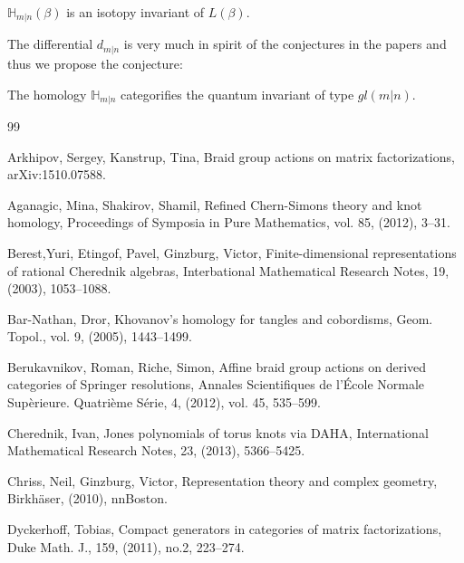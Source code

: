 \documentclass[10pt]{amsart}
\begin{document}
\begin{theorem}\cite{OR} $\mathbb{H}_{m|n}(\beta)$ is an isotopy invariant of $L(\beta)$.
\end{theorem}

The differential $d_{m|n}$ is very much in spirit of the conjectures in the papers \cite{ORS, GGS} and thus we propose the conjecture:

\begin{conjecture} The homology $\mathbb{H}_{m|n}$ categorifies the quantum invariant of type $gl(m|n)$.
\end{conjecture}




\printindex[notationlist]





\begin{thebibliography}{99}


 Arkhipov, Sergey,
Kanstrup, Tina,
Braid group actions on matrix factorizations, arXiv:1510.07588.




Aganagic, Mina,
Shakirov, Shamil,
Refined Chern-Simons theory and knot homology,
Proceedings of Symposia in Pure Mathematics,
vol. 85,
(2012),
3--31.



Berest,Yuri,
Etingof, Pavel,
Ginzburg, Victor,
Finite-dimensional representations of rational Cherednik algebras,
Interbational Mathematical Research Notes, 19,
(2003),
1053--1088.


Bar-Nathan, Dror,
Khovanov's homology for tangles and cobordisms,
Geom. Topol.,
vol. 9,
(2005),
1443--1499.


 Berukavnikov, Roman, Riche, Simon,
Affine braid group actions on derived categories of Springer resolutions,
Annales Scientifiques de l'\'Ecole Normale Sup\`erieure. Quatri\`eme S\'erie,
4,
(2012),
vol. 45,
535--599.


Cherednik, Ivan,
Jones polynomials of torus knots via DAHA,
International Mathematical Research Notes,
23,
(2013),
5366--5425.



Chriss, Neil,
Ginzburg, Victor,
Representation theory and complex geometry,
Birkh\"aser,
(2010),
nnBoston.


Dyckerhoff, Tobias,
Compact generators in categories of matrix factorizations,
Duke Math. J.,
159,
(2011),
 no.2,
223--274.



\end{thebibliography}
\end{document}

